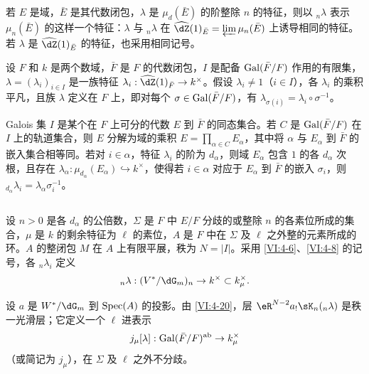 \subsection{}\label{VI:6-1}

若 $E$ 是域，$\bar E$ 是其代数闭包，$\lambda$ 是 $\mu_d(\bar E)$ 的阶整除 $n$ 的特征，则以 $_n\lambda$ 表示 $\mu_n(\bar E)$ 的这样一个特征：$\lambda$ 与 $_n \lambda$ 在 $\widehat\dZ(1)_{\bar E} = \varprojlim \mu_n(\bar E)$ 上诱导相同的特征。若 $\lambda$ 是 $\widehat\dZ(1)_{\bar E}$ 的特征，也采用相同记号。

设 $F$ 和 $k$ 是两个数域，$\bar F$ 是 $F$ 的代数闭包，$I$ 是配备 $\operatorname{Gal}(\bar F/F)$ 作用的有限集，$\lambda=(\lambda_i)_{i\in I}$ 是一族特征 $\lambda_i:\widehat\dZ(1)_{\bar F} \to k^\times$。假设 $\lambda_i\ne 1$（$i\in I$），各 $\lambda_i$ 的乘积平凡，且族 $\lambda$ 定义在 $F$ 上，即对每个 $\sigma\in \operatorname{Gal}(\bar F/F)$，有 $\lambda_{\sigma(i)}=\lambda_i\circ \sigma^{-1}$。

Galois 集 $I$ 是某个在 $F$ 上可分的代数 $E$ 到 $\bar F$ 的同态集合。若 $C$ 是 $\operatorname{Gal}(\bar F/F)$ 在 $I$ 上的轨道集合，则 $E$ 分解为域的乘积 $E=\prod_{\alpha\in C} E_\alpha$，其中将 $\alpha$ 与 $E_\alpha$ 到 $\bar F$ 的嵌入集合相等同。若对 $i\in \alpha$，特征 $\lambda_i$ 的阶为 $d_\alpha$，则域 $E_\alpha$ 包含 $1$ 的各 $d_\alpha$ 次根，且存在 $\lambda_\alpha:\mu_{d_\alpha}(E_\alpha) \hookrightarrow k^\times$，使得若 $i\in \alpha$ 对应于 $E_\alpha$ 到 $\bar F$ 的嵌入 $\sigma_i$，则 $_{d_\alpha} \lambda_i = \lambda_\alpha \sigma_i^{-1}$。

\subsection{}\label{VI:6-2}

设 $n>0$ 是各 $d_\alpha$ 的公倍数，$\Sigma$ 是 $F$ 中 $E/F$ 分歧的或整除 $n$ 的各素位所成的集合，$\mu$ 是 $k$ 的剩余特征为 $\ell$ 的素位，$A$ 是 $F$ 中在 $\Sigma$ 及 $\ell$ 之外整的元素所成的环。$A$ 的整闭包 $M$ 在 $A$ 上有限平展，秩为 $N=|I|$。采用 \ref{VI:4-6}、\ref{VI:4-8} 的记号，各 $_n \lambda_i$ 定义
\[
  _n\lambda:(V^\ast/\dG_m)_n \to k^\times \subset k_\mu^\times \text{.}
\]

设 $a$ 是 $W^\ast/\dG_m$ 到 $\operatorname{Spec}(A)$ 的投影。由 \ref{VI:4-20}，层 $\eR^{N-2} a_! \sK_n(_n \lambda)$ 是秩一光滑层；它定义一个 $\ell$ 进表示
\[
  j_\mu[\lambda]:\operatorname{Gal}(\bar F/F)^\text{ab} \to k_\mu^\times
\]
（或简记为 $j_\mu$），在 $\Sigma$ 及 $\ell$ 之外不分歧。

